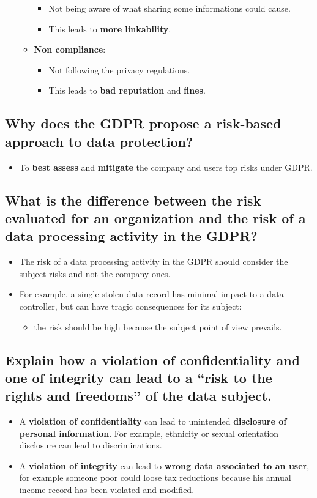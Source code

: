 \documentclass[9pt, letterpaper]{article}
\begin{document}
\begin{itemize}
\begin{itemize}
\begin{itemize}
			\item Not being aware of what sharing some informations could cause.
			\item This leads to \textbf{more linkability}.
		\end{itemize}		
		\item \textbf{Non compliance}: 
		\begin{itemize}
			\item Not following the privacy regulations.
			\item This leads to \textbf{bad reputation} and \textbf{fines}.
		\end{itemize}	
	\end{itemize}
\end{itemize}

\subsection{Why does the GDPR propose a risk-based approach to data protection?}
\begin{itemize}
	\item To \textbf{best assess} and \textbf{mitigate} the company and users top risks under GDPR.
\end{itemize}

\subsection{What is the difference between the risk evaluated for an organization and the risk of a data processing activity in the GDPR?}
\begin{itemize}
	\item The risk of a data processing activity in the GDPR should consider the subject risks and not the company ones.
	\item For example, a single stolen data record has minimal impact to a data controller, but can have tragic consequences for its subject: 
		\begin{itemize}
			\item the risk should be high because the subject point of view prevails.
		\end{itemize}
\end{itemize}

\subsection{Explain how a violation of confidentiality and one of integrity can lead to a “risk to the rights and freedoms” of the data subject.}
\begin{itemize}
	\item A \textbf{violation of confidentiality} can lead to unintended \textbf{disclosure of personal information}. For example, ethnicity or sexual orientation disclosure can lead to discriminations.
	\item A \textbf{violation of integrity} can lead to \textbf{wrong data associated to an user}, for example someone poor could loose tax reductions because his annual income record has been violated and modified.
\end{itemize}
\end{document}
